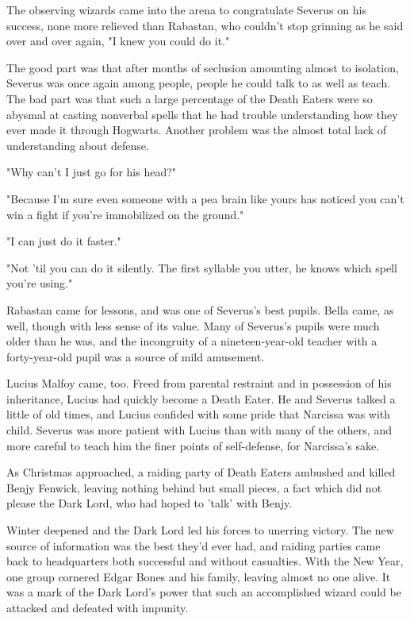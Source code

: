 \documentclass[a4paper,11pt]{article}
\begin{document}
The observing wizards came into the arena to congratulate Severus on his success, none more relieved than Rabastan, who couldn't stop grinning as he said over and over again, "I knew you could do it."

The good part was that after months of seclusion amounting almost to isolation, Severus was once again among people, people he could talk to as well as teach. The bad part was that such a large percentage of the Death Eaters were so abysmal at casting nonverbal spells that he had trouble understanding how they ever made it through Hogwarts. Another problem was the almost total lack of understanding about defense.

"Why can't I just go for his head?"

"Because I'm sure even someone with a pea brain like yours has noticed you can't win a fight if you're immobilized on the ground."

"I can just do it faster."

"Not 'til you can do it silently. The first syllable you utter, he knows which spell you're using."

Rabastan came for lessons, and was one of Severus's best pupils. Bella came, as well, though with less sense of its value. Many of Severus's pupils were much older than he was, and the incongruity of a nineteen-year-old teacher with a forty-year-old pupil was a source of mild amusement.

Lucius Malfoy came, too. Freed from parental restraint and in possession of his inheritance, Lucius had quickly become a Death Eater. He and Severus talked a little of old times, and Lucius confided with some pride that Narcissa was with child. Severus was more patient with Lucius than with many of the others, and more careful to teach him the finer points of self-defense, for Narcissa's sake.

As Christmas approached, a raiding party of Death Eaters ambushed and killed Benjy Fenwick, leaving nothing behind but small pieces, a fact which did not please the Dark Lord, who had hoped to 'talk' with Benjy.

Winter deepened and the Dark Lord led his forces to unerring victory. The new source of information was the best they'd ever had, and raiding parties came back to headquarters both successful and without casualties. With the New Year, one group cornered Edgar Bones and his family, leaving almost no one alive. It was a mark of the Dark Lord's power that such an accomplished wizard could be attacked and defeated with impunity.
\end{document}
